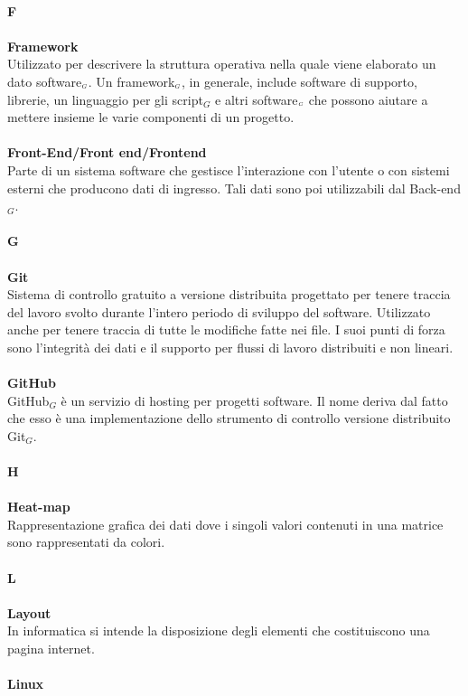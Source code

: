 \\
\textbf{F} \\
\\
\textbf{Framework}\\
Utilizzato per descrivere la struttura operativa nella quale viene elaborato un dato software$_{\scaleto{G}{3pt}}$.
Un framework$_{\scaleto{G}{3pt}}$, in generale, include software di supporto, librerie, un linguaggio per gli script$_G$ e altri software$_{\scaleto{G}{3pt}}$ che possono aiutare a mettere insieme le varie componenti di un progetto.\\
\\
\textbf{Front-End/Front end/Frontend} \\
Parte di un sistema software che gestisce l'interazione con l'utente o con sistemi esterni che producono dati di ingresso.
Tali dati sono poi utilizzabili dal Back-end$_G$.\\
\\
\textbf{G}\\
\\
\textbf{Git}\\
Sistema di controllo gratuito a versione distribuita progettato per tenere traccia del lavoro svolto durante l'intero periodo di sviluppo del software.
Utilizzato anche per tenere traccia di tutte le modifiche fatte nei file.
I suoi punti di forza sono l'integrità dei dati e il supporto per flussi di lavoro distribuiti e non lineari.\\
\\
\textbf{GitHub}\\
GitHub$_G$ è un servizio di hosting per progetti software. Il nome deriva dal fatto che esso è una implementazione dello strumento di controllo versione distribuito Git$_G$.\\
\\
\textbf{H}\\
\\
\textbf{Heat-map}\\
Rappresentazione grafica dei dati dove i singoli valori contenuti in una matrice sono rappresentati da colori.\\
\\
\textbf{L}\\
\\
\textbf{Layout}\\
In informatica si intende la disposizione degli elementi che costituiscono una pagina internet.\\
\\
\textbf{Linux}\\
